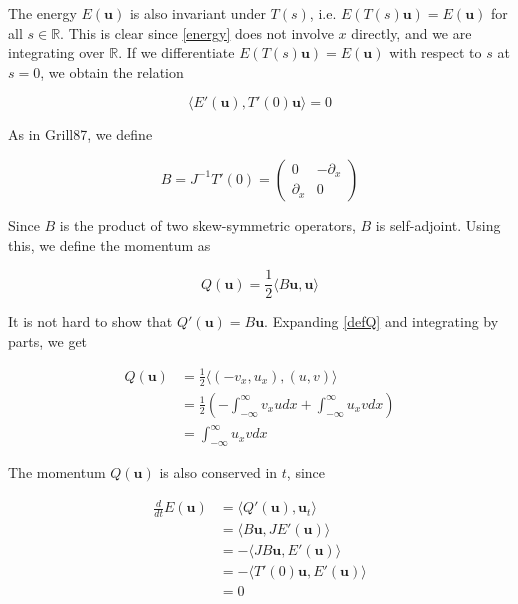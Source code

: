 \documentclass[12pt]{article}
\def\R{{\mathbb R}}
\begin{document}
The energy $E(\textbf{u})$ is also invariant under $T(s)$, i.e. $E(T(s) \textbf{u}) = E(\textbf{u})$ for all $s \in \R$. This is clear since \eqref{energy} does not involve $x$ directly, and we are integrating over $\R$. If we differentiate $E(T(s) \textbf{u}) = E(\textbf{u})$ with respect to $s$ at $s = 0$, we obtain the relation

\begin{equation}\label{IP1}
\langle E'(\textbf{u}), T'(0) \textbf{u} \rangle = 0
\end{equation}

As in Grill87, we define 

\begin{equation}\label{defB}
B = J^{-1} T'(0) = \begin{pmatrix}0 & -\partial_x \\ \partial_x & 0\end{pmatrix}
\end{equation}

Since $B$ is the product of two skew-symmetric operators, $B$ is self-adjoint. Using this, we define the momentum as

\begin{equation}\label{defQ}
Q(\textbf{u}) = \frac{1}{2}\langle B \textbf{u}, \textbf{u} \rangle
\end{equation}

It is not hard to show that $Q'(\textbf{u}) = B \textbf{u}$. Expanding \eqref{defQ} and integrating by parts, we get

\begin{align*}
Q(\textbf{u}) &= \frac{1}{2}\langle (-v_x, u_x), (u, v) \rangle \\
&= \frac{1}{2} \left( -\int_{-\infty}^\infty v_x u dx + \int_{-\infty}^\infty u_x v dx \right) \\
&= \int_{-\infty}^\infty u_x v dx
\end{align*}

The momentum $Q(\textbf{u})$ is also conserved in $t$, since

\begin{align*}
\frac{d}{dt} E(\textbf{u}) &= \langle Q'(\textbf{u}), \textbf{u}_t \rangle \\ 
&= \langle B \textbf{u}, J E'(\textbf{u}) \rangle \\
&= -\langle J B \textbf{u}, E'(\textbf{u}) \rangle \\
&= -\langle T'(0) \textbf{u}, E'(\textbf{u}) \rangle \\
&= 0
\end{align*}
\end{document}
